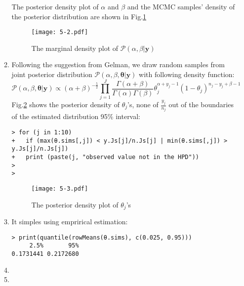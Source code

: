 \documentclass[twoside,11pt]{amsart}
\begin{document}
\begin{enumerate}
\begin{enumerate}
    The posterior density plot of $\alpha$ and $\beta$ and the MCMC
    samples' density of the posterior distribution are shown in Fig.\ref{fig:5-2}
    \begin{figure}[h]
        \texttt{[image: 5-2.pdf]}
        \caption{The marginal density plot of $\mathscr P(\alpha, \beta|\bm y)$}\label{fig:5-2}
      \end{figure}
  \item
    Following the suggestion from Gelman, we draw random samples from
    joint posterior distribution $\mathscr P(\alpha, \beta,
    \bm\theta|\bm y)$ with following density function:
    \[\mathscr P(\alpha, \beta,
    \bm\theta|\bm y)\propto 
    (\alpha+\beta)^{-\frac{5}{2}}\prod_{j=1}^J\frac{\Gamma(\alpha+\beta)}{\Gamma(\alpha)\Gamma(\beta)}\theta_j^{\alpha+y_j-1}(1-\theta_j)^{n_j-y_j+\beta-1}
    \]
    Fig.\ref{fig:5-3} shows the posterior density of $\theta_j$'s,
    none of $\frac{y_j}{n_j}$ out of the boundaries of the estimated
    distribution 95\% interval:
    \begin{small}
    \begin{verbatim}
> for (j in 1:10)
+   if (max(θ.sims[,j]) < y.Js[j]/n.Js[j] | min(θ.sims[,j]) > y.Js[j]/n.Js[j])
+   print (paste(j, "observed value not in the HPD"))
>   
> 
    \end{verbatim}
    \end{small}
    \begin{figure}[h]
        \texttt{[image: 5-3.pdf]}
        \caption{The posterior density plot of $\theta_j$'s}\label{fig:5-3}
      \end{figure}
  \item
    It simples using emprirical estimation:
    \begin{verbatim}
> print(quantile(rowMeans(θ.sims), c(0.025, 0.95)))
     2.5%       95% 
0.1731441 0.2172680       
    \end{verbatim}
  \item
    
  \item

  \end{enumerate}
  
\end{enumerate}
\end{document}

